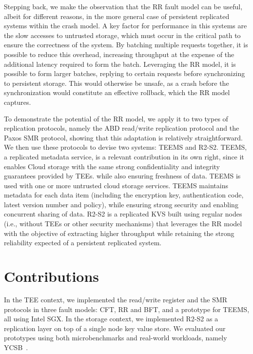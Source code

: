 Stepping back, we make the observation that the \ac{RR} fault
model can be useful, albeit for different reasons, in the more
general case of persistent replicated systems within the crash
model. A key factor for performance in this systems are the slow
accesses to untrusted storage, which must occur in the critical
path to ensure the correctness of the system. By batching
multiple requests together, it is possible to reduce this
overhead, increasing throughput at the expense of the additional
latency required to form the batch. Leveraging the \ac{RR} model,
it is possible to form larger batches, replying to
certain requests before synchronizing to persistent storage. This
would otherwise be unsafe, as a crash before the synchronization
would constitute an effective rollback, which the \ac{RR} model
captures.

To demonstrate the potential of the \ac{RR} model, we apply it to
two types of replication protocols, namely the \ac{ABD}
 read/write replication protocol and the Paxos \ac{SMR}
protocol, showing that this adaptation is relatively straightforward.
We then use these protocols to devise two systems: \ac{TEEMS} and
\ac{R2-S2}. \ac{TEEMS}, a replicated metadata service,
is a relevant contribution in its own right, since
it enables Cloud storage with the same strong confidentiality and
integrity guarantees provided by \acp{TEE}. while also ensuring freshness
of data. \ac{TEEMS} is used with one or more untrusted cloud storage
services. \ac{TEEMS} maintains metadata for each data item (including the
encryption key, authentication code, latest version number and
policy), while ensuring strong security and enabling concurrent
sharing of data. \ac{R2-S2} is a replicated \ac{KVS} built
using regular nodes (i.e., without TEEs or other security
mechanisms) that leverages the \ac{RR} model with the objective
of extracting higher throughput while retaining the strong reliability expected of a persistent
replicated system.

\section{Contributions}

In the \ac{TEE} context, we implemented the read/write
register and the \ac{SMR} protocols in three fault models:
\ac{CFT}, \ac{RR} and \ac{BFT}, and a prototype for \ac{TEEMS},
all using Intel SGX. In the storage context, we implemented
\ac{R2-S2} as a replication layer on top of a single node key
value store. We evaluated our prototypes using both
microbenchmarks and real-world workloads, namely
\ac{YCSB}~\cite{ycsb}.

